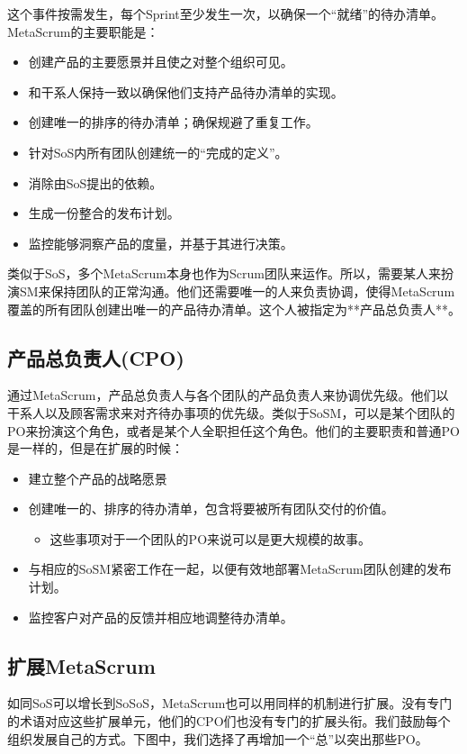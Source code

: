 \documentclass[12pt,a4paper,parskip=full]{scrartcl}
\begin{document}
\begin{CJK*}{UTF8}{gbsn}
这个事件按需发生，每个Sprint至少发生一次，以确保一个“就绪”的待办清单。MetaScrum的主要职能是：

\begin{itemize}
\item 创建产品的主要愿景并且使之对整个组织可见。
\item 和干系人保持一致以确保他们支持产品待办清单的实现。
\item 创建唯一的排序的待办清单；确保规避了重复工作。
\item 针对SoS内所有团队创建统一的“完成的定义”。
\item 消除由SoS提出的依赖。
\item 生成一份整合的发布计划。
\item 监控能够洞察产品的度量，并基于其进行决策。
\end{itemize}

类似于SoS，多个MetaScrum本身也作为Scrum团队来运作。所以，需要某人来扮演SM来保持团队的正常沟通。他们还需要唯一的人来负责协调，使得MetaScrum覆盖的所有团队创建出唯一的产品待办清单。这个人被指定为**产品总负责人**。

\subsection{产品总负责人(CPO)}
通过MetaScrum，产品总负责人与各个团队的产品负责人来协调优先级。他们以干系人以及顾客需求来对齐待办事项的优先级。类似于SoSM，可以是某个团队的PO来扮演这个角色，或者是某个人全职担任这个角色。他们的主要职责和普通PO是一样的，但是在扩展的时候：
\begin{itemize}
\item 建立整个产品的战略愿景
\item 创建唯一的、排序的待办清单，包含将要被所有团队交付的价值。
\begin{itemize}
\item 这些事项对于一个团队的PO来说可以是更大规模的故事。
\end{itemize}
\item 与相应的SoSM紧密工作在一起，以便有效地部署MetaScrum团队创建的发布计划。
\item 监控客户对产品的反馈并相应地调整待办清单。
\end{itemize}

\subsection{扩展MetaScrum}
如同SoS可以增长到SoSoS，MetaScrum也可以用同样的机制进行扩展。没有专门的术语对应这些扩展单元，他们的CPO们也没有专门的扩展头衔。我们鼓励每个组织发展自己的方式。下图中，我们选择了再增加一个“总”以突出那些PO。


\end{CJK*}
\end{document}
